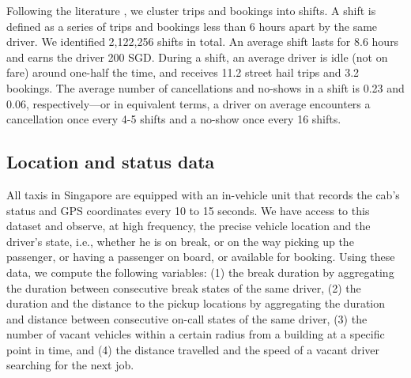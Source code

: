 \documentclass[reviewmode,AEJ]{AEA}
\begin{document}
Following the literature \citep{farber2015you,agarwal2015singaporean}%
, we cluster trips and bookings into shifts. A shift is defined as a series of trips and bookings less than 6 
hours apart by the same driver. %
We identified 2,122,256 shifts in total. An average shift lasts for 8.6 hours and earns the driver 200 SGD. 
During a shift, an average driver is idle (not on fare) around one-half the time, and receives 11.2 street
hail trips and 3.2 bookings. %
The average number of cancellations and no-shows in a shift is 0.23 and 0.06, respectively---or in equivalent terms,
a driver on average encounters a cancellation once every 4-5 shifts and a no-show once every 16 shifts.


\subsection{Location and status data}
All taxis in Singapore are equipped with an in-vehicle unit that records the cab's status and GPS 
coordinates every 10 to 15 seconds. We have access to this dataset and %
observe, at high frequency, the precise vehicle location and the driver's state, i.e., whether he is on break, or on the way picking up the passenger, or having a passenger on board, or available for booking. Using these data, we compute the following variables: (1) the break duration by aggregating the duration between consecutive break states of the same driver, (2) the duration and  the distance to the pickup locations by aggregating the duration and distance between consecutive on-call states of the same driver, (3) the number of vacant vehicles within a certain radius from a building at a specific point in time, and (4) the distance travelled and the speed of a vacant driver searching for the next job. 
\end{document}

